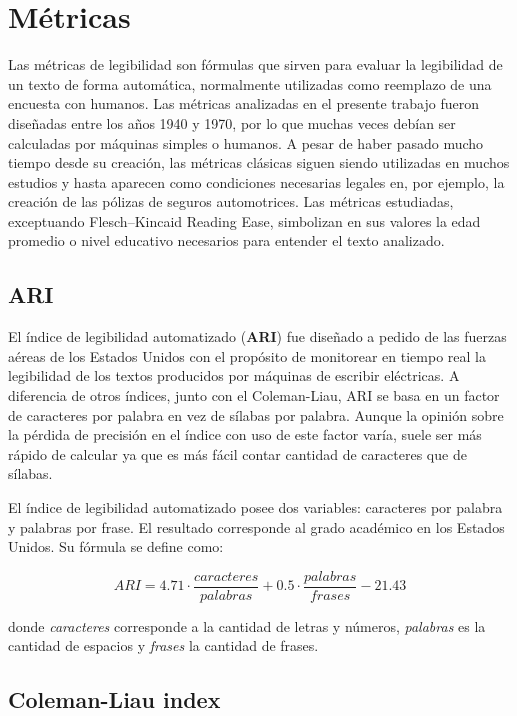 \documentclass[12pt,journal,compsoc]{IEEEtran}
\begin{document}
\section{Métricas}\label{sec:metricas}

Las métricas de legibilidad son fórmulas que sirven para evaluar la legibilidad de un texto de forma automática, normalmente utilizadas como reemplazo de una encuesta con humanos. Las métricas analizadas en el presente trabajo fueron diseñadas entre los años 1940 y 1970, por lo que muchas veces debían ser calculadas por máquinas simples o humanos. A pesar de haber pasado mucho tiempo desde su creación, las métricas clásicas siguen siendo utilizadas en muchos estudios y hasta aparecen como condiciones necesarias legales en, por ejemplo, la creación de las pólizas de seguros automotrices. Las métricas estudiadas, exceptuando Flesch–Kincaid Reading Ease, simbolizan en sus valores la edad promedio o nivel educativo necesarios para entender el texto analizado. %

\subsection{ARI}

El índice de legibilidad automatizado (\textbf{ARI})\cite{ari-flesch} fue diseñado a pedido de las fuerzas aéreas de los Estados Unidos con el propósito de monitorear en tiempo real la legibilidad de los textos producidos por máquinas de escribir eléctricas. A diferencia de otros índices, junto con el Coleman-Liau, ARI se basa en un factor de caracteres por palabra en vez de sílabas por palabra. Aunque la opinión sobre la pérdida de precisión en el índice con uso de este factor varía, suele ser más rápido de calcular ya que es más fácil contar cantidad de caracteres que de sílabas\cite{liang}.

El índice de legibilidad automatizado posee dos variables: caracteres por palabra y palabras por frase. El resultado corresponde al grado académico en los Estados Unidos. Su fórmula se define como:

$$ARI = 4.71\cdot \frac{caracteres}{palabras}+0.5\cdot \frac{palabras}{frases} - 21.43$$

donde \textit{caracteres} corresponde a la cantidad de letras y números, \textit{palabras} es la cantidad de espacios y \textit{frases} la cantidad de frases.

\subsection{Coleman-Liau index}
\end{document}

